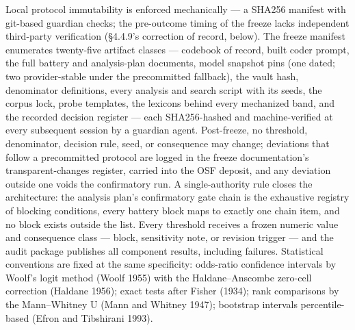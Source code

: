 Local protocol immutability is enforced mechanically --- a SHA256 manifest with git-based guardian checks; the pre-outcome timing of the freeze lacks independent third-party verification (\S{}4.4.9's correction of record, below). The freeze manifest enumerates twenty-five artifact classes --- codebook of record, built coder prompt, the full battery and analysis-plan documents, model snapshot pins (one dated; two provider-stable under the precommitted fallback), the vault hash, denominator definitions, every analysis and search script with its seeds, the corpus lock, probe templates, the lexicons behind every mechanized band, and the recorded decision register --- each SHA256-hashed and machine-verified at every subsequent session by a guardian agent. Post-freeze, no threshold, denominator, decision rule, seed, or consequence may change; deviations that follow a precommitted protocol are logged in the freeze documentation's transparent-changes register, carried into the OSF deposit, and any deviation outside one voids the confirmatory run. A single-authority rule closes the architecture: the analysis plan's confirmatory gate chain is the exhaustive registry of blocking conditions, every battery block maps to exactly one chain item, and no block exists outside the list. Every threshold receives a frozen numeric value and consequence class --- block, sensitivity note, or revision trigger --- and the audit package publishes all component results, including failures. Statistical conventions are fixed at the same specificity: odds-ratio confidence intervals by Woolf's logit method (Woolf 1955) with the Haldane--Anscombe zero-cell correction (Haldane 1956); exact tests after Fisher (1934); rank comparisons by the Mann--Whitney U (Mann and Whitney 1947); bootstrap intervals percentile-based (Efron and Tibshirani 1993).

